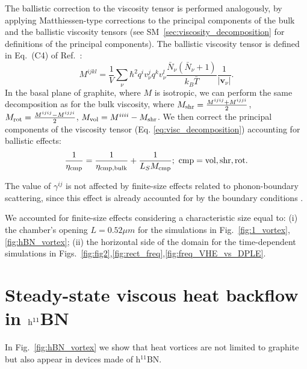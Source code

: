 \documentclass[
prb,
twocolumn,
superscriptaddress,
 amsmath,amssymb,
 aps,
longbibliography,
]{revtex4-2}
\newcommand*{\state}{\ensuremath{\nu}}
\begin{document}
The ballistic correction to the viscosity tensor is performed analogously, by applying Matthiessen-type corrections to the principal components of the bulk and the ballistic viscosity tensors (see SM~\ref{sec:viscosity_decomposition} for definitions of the principal components). The ballistic viscosity tensor is defined in Eq.~(C4) of Ref.~\cite{Simoncelli2020}:
\begin{equation}
  M^{ijkl} = \frac{1}{V} \sum_\state
    \hbar^2 q^i v^j_\state q^k v^l_\state
    \frac{\bar{N}_\state(\bar{N}_\state+1)}{k_B \bar{T}}
    \frac{1}{|\bm{v}_{\state}|}.
      \label{eq:viscosity_fs}
\end{equation}
In the basal plane of graphite, where $M$ is isotropic, we can perform the same decomposition as for the bulk viscosity, where $M_{\rm shr} = \tfrac{M^{ijij}+M^{ijji}}{2}$, $M_{\rm rot} = \tfrac{M^{ijij}-M^{ijji}}{2}$, $M_{\rm vol} = M^{iiii} - M_{\rm shr}$. We then correct the principal components of the viscosity tensor (Eq. \ref{eq:visc_decomposition}) accounting for ballistic effects:
\begin{equation}
  \begin{split}
      \frac{1}{\eta_{\rm cmp}} = \frac{1}{\eta_{\rm cmp, bulk}} + \frac{1}{L_S M_{\rm cmp}};\ \rm cmp = vol, shr, rot.
  \end{split}
  \label{eq:viscosity_comb}
  \raisetag{12mm}
\end{equation}

The value of $\gamma^{ij}$ is not affected by finite-size effects related to phonon-boundary scattering, since this effect is already accounted for by the boundary conditions \cite{ziman1960electrons}.

We accounted for finite-size effects considering a characteristic size equal to: (i) the chamber's opening $L=0.52\mu m$ for the simulations in Fig.~\ref{fig:1_vortex}, \ref{fig:hBN_vortex}; (ii) the horizontal side of the domain for the time-dependent simulations in Figs.~\ref{fig:fig2},\ref{fig:rect_freq},\ref{fig:freq_VHE_vs_DPLE}.



\section{Steady-state viscous heat backflow in \texorpdfstring{${\rm h}^{11}$BN}{hBN}}
\label{sec:steady_state_viscous_heat_backflow_in_h}
In Fig.~\ref{fig:hBN_vortex} we show that heat vortices are not limited to graphite but also appear in devices made of h$^{11}$BN.
\end{document}
